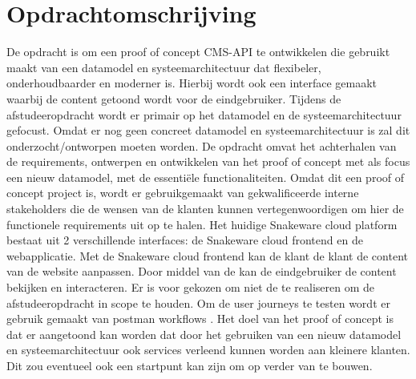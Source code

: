 \section{Opdrachtomschrijving}
De opdracht is om een proof of concept \gls{CMS}-API te ontwikkelen die gebruikt maakt van een datamodel en systeemarchitectuur dat flexibeler, onderhoudbaarder en moderner is.
Hierbij wordt ook een interface gemaakt waarbij de content getoond wordt voor de eindgebruiker.
Tijdens de afstudeeropdracht wordt er primair op het datamodel en de systeemarchitectuur gefocust.
Omdat er nog geen concreet datamodel en systeemarchitectuur is zal dit onderzocht/ontworpen moeten worden.
\whitespace
De opdracht omvat het achterhalen van de requirements, ontwerpen en ontwikkelen van het proof of concept met als focus een nieuw datamodel, met de essentiële functionaliteiten.
Omdat dit een proof of concept project is, wordt er gebruikgemaakt van gekwalificeerde interne stakeholders die de wensen van de klanten kunnen vertegenwoordigen om hier de functionele requirements uit op te halen.
\whitespace
Het huidige Snakeware cloud platform bestaat uit 2 verschillende interfaces: de Snakeware cloud frontend en de webapplicatie.
Met de Snakeware cloud frontend kan de klant de klant de content van de website aanpassen.
Door middel van de  kan de eindgebruiker de content bekijken en interacteren.
Er is voor gekozen om niet de  te realiseren om de afstudeeropdracht in scope te houden.
Om de user journeys te testen wordt er gebruik gemaakt van postman workflows \Parencite{PostmanWorkflows}.
\whitespace
Het doel van het proof of concept is dat er aangetoond kan worden dat door het gebruiken van een nieuw datamodel en systeemarchitectuur ook services verleend kunnen worden aan kleinere klanten.
Dit zou eventueel ook een startpunt kan zijn om op verder van te bouwen.
